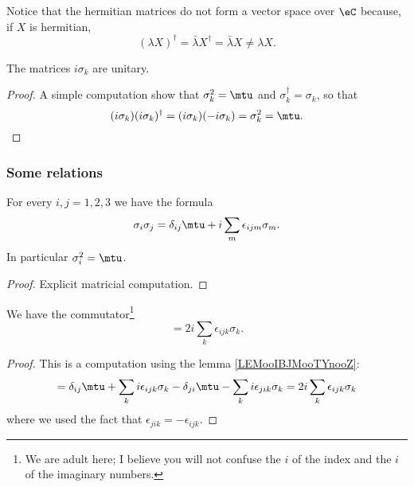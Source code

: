Notice that the hermitian matrices do not form a vector space over \( \eC\) because, if \( X\) is hermitian,
\begin{equation}
	(\lambda X)^{\dag}=\bar \lambda X^{\dag}=\bar \lambda X\neq \lambda X.
\end{equation}

\begin{lemma}
	The matrices \( i\sigma_k\) are unitary.
\end{lemma}

\begin{proof}
	A simple computation show that \( \sigma_k^2=\mtu\) and \( \sigma_k^{\dag}=\sigma_k\), so that
	\begin{equation}
		(i\sigma_k)(i\sigma_k)^{\dag}=(i\sigma_k)(-i\sigma_k)=\sigma_k^2=\mtu.
	\end{equation}
\end{proof}


\subsubsection{Some relations}

\begin{lemma}       \label{LEMooIBJMooTYnooZ}
	For every \( i,j=1,2,3\) we have the formula
	\begin{equation}
		\sigma_i\sigma_j=\delta_{ij}\mtu+i\sum_m\epsilon_{ijm}\sigma_m.
	\end{equation}
	In particular \( \sigma_i^2=\mtu\).
\end{lemma}

\begin{proof}
	Explicit matricial computation.
\end{proof}

\begin{lemma}       \label{LEMooJRWXooMkzRnk}
	We have the commutator\footnote{We are adult here; I believe you will not confuse the \( i\) of the index and the \( i\) of the imaginary numbers.}
	\begin{equation}
		[\sigma_i,\sigma_j]=2i\sum_k\epsilon_{ijk}\sigma_k.
	\end{equation}
\end{lemma}

\begin{proof}
	This is a computation using the lemma \ref{LEMooIBJMooTYnooZ}:
	\begin{equation}
		[\sigma_i,\sigma_j]=\delta_{ij}\mtu+\sum_ki\epsilon_{ijk}\sigma_k-\delta_{ji}\mtu-\sum_{k}i\epsilon_{jik}\sigma_k=2i\sum_k\epsilon_{ijk}\sigma_k
	\end{equation}
	where we used the fact that \( \epsilon_{jik}=-\epsilon_{ijk}\).
\end{proof}

